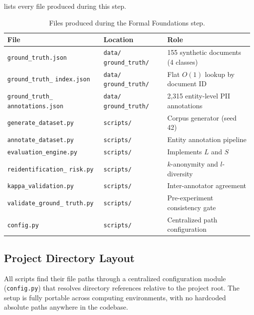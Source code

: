 \documentclass[12pt, a4paper]{article}
\begin{document}
 lists every file produced during this step.

\begin{table}[H]
\centering
\caption{Files produced during the Formal Foundations step.}
\label{tab:deliverables}
\scriptsize
\setlength{\tabcolsep}{3pt}
\begin{tabular}{L{3.3cm} L{2.2cm} L{6.6cm}}
\toprule
{}
\color{white}\textbf{File} &
\color{white}\textbf{Location} &
\color{white}\textbf{Role} \\
\midrule
\texttt{ground\_truth.json}           & \texttt{data/} \texttt{ground\_truth/} & 155 synthetic documents (4 classes) \\
\texttt{ground\_truth\_} \texttt{index.json} & \texttt{data/} \texttt{ground\_truth/} & Flat $O(1)$ lookup by document ID \\
\texttt{ground\_truth\_} \texttt{annotations.json} & \texttt{data/} \texttt{ground\_truth/} & 2{,}315 entity-level PII annotations \\
\texttt{generate\_dataset.py}         & \texttt{scripts/}  & Corpus generator (seed 42) \\
\texttt{annotate\_dataset.py}         & \texttt{scripts/}  & Entity annotation pipeline \\
\texttt{evaluation\_engine.py}        & \texttt{scripts/}  & Implements $L$ and $S$ \\
\texttt{reidentification\_} \texttt{risk.py} & \texttt{scripts/}  & $k$-anonymity and $l$-diversity \\
\texttt{kappa\_validation.py}         & \texttt{scripts/}  & Inter-annotator agreement \\
\texttt{validate\_ground\_} \texttt{truth.py} & \texttt{scripts/}  & Pre-experiment consistency gate \\
\texttt{config.py}                         & \texttt{scripts/}           & Centralized path configuration \\
\bottomrule
\end{tabular}
\setlength{\tabcolsep}{6pt}
\end{table}

\subsection{Project Directory Layout}

All scripts find their file paths through a centralized configuration module (\texttt{config.py}) that resolves directory references relative to the project root. The setup is fully portable across computing environments, with no hardcoded absolute paths anywhere in the codebase.
\end{document}
